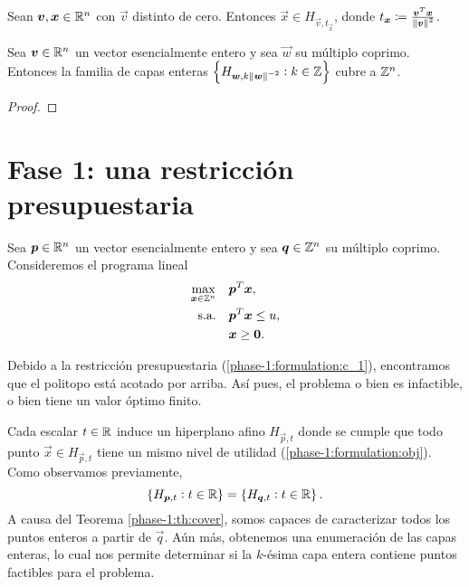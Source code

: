 \begin{lemma}
	Sean $\boldsymbol{v}, \boldsymbol{x} \in \mathbb{R}^n$ con $\vec{v}$ distinto de cero. Entonces $\vec{x} \in
	H_{\vec{v}, t_{\vec{x}}}$, donde $t_{\boldsymbol{x}} \coloneq \frac{\boldsymbol{v}^T\boldsymbol{x}}{\left\lVert \boldsymbol{v} \right\rVert^2}$.
\end{lemma}

\begin{theorem}
	\label{phase-1:th:cover}
	Sea $\boldsymbol{v} \in \mathbb{R}^n$ un vector esencialmente entero y sea $\vec{w}$ su múltiplo coprimo.
	Entonces la familia de capas enteras $\left\lbrace H_{\boldsymbol{w}, k\left\lVert \boldsymbol{w} \right\rVert^{-2}} \vcentcolon k
			\in \mathbb{Z} \right\rbrace$ cubre a $\mathbb{Z}^n$.
\end{theorem}
\begin{proof}
\end{proof}

\section{Fase 1: una restricción presupuestaria}

\noindent
Sea $\boldsymbol{p} \in \mathbb{R}^n$ un vector esencialmente entero y sea $\boldsymbol{q} \in \mathbb{Z}^n$ su múltiplo coprimo.
Consideremos el programa lineal 
\begin{subequations}
	\label{phase-1:formulation}
	\begin{align}
		\max_{\boldsymbol{x} \in \mathbb{Z}^n} \quad
			& \boldsymbol{p}^T\boldsymbol{x}, \label{phase-1:formulation:obj} \\
		\text{s.a.} \quad
			& \boldsymbol{p}^T\boldsymbol{x} \leq u, \label{phase-1:formulation:c_1} \\
			& \boldsymbol{x} \geq \boldsymbol{0}. \nonumber
	\end{align}
\end{subequations}

\begin{observation}
	Debido a la restricción presupuestaria (\ref{phase-1:formulation:c_1}), encontramos que el
	politopo está acotado por arriba. Así pues, el problema o bien es infactible, o bien tiene un
	valor óptimo finito.
\end{observation}

Cada escalar $t \in \mathbb{R}$ induce un hiperplano afino $H_{\vec{p}, t}$ donde se cumple que todo punto
$\vec{x} \in H_{\vec{p}, t}$ tiene un mismo nivel de utilidad (\ref{phase-1:formulation:obj}). Como
observamos previamente,
\begin{equation*}
	\left \lbrace H_{\boldsymbol{p}, t} \vcentcolon t \in \mathbb{R} \right\rbrace
	=
	\left \lbrace H_{\boldsymbol{q}, t} \vcentcolon t \in \mathbb{R} \right\rbrace.
\end{equation*}
A causa del Teorema \ref{phase-1:th:cover}, somos capaces de caracterizar todos los puntos enteros a
partir de $\vec{q}$. Aún más, obtenemos una enumeración de las capas enteras, lo cual nos permite
determinar si la $k$-ésima capa entera contiene puntos factibles para el problema.

